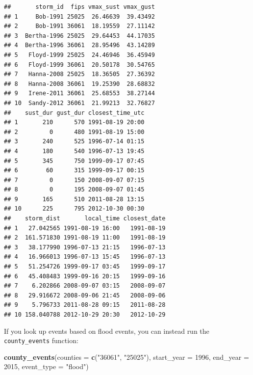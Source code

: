 \documentclass[]{tufte-book}
\newenvironment{Shaded}{}{}
\newcommand{\DataTypeTok}[1]{\textcolor[rgb]{0.56,0.13,0.00}{#1}}
\newcommand{\DecValTok}[1]{\textcolor[rgb]{0.25,0.63,0.44}{#1}}
\newcommand{\KeywordTok}[1]{\textcolor[rgb]{0.00,0.44,0.13}{\textbf{#1}}}
\newcommand{\NormalTok}[1]{#1}
\newcommand{\StringTok}[1]{\textcolor[rgb]{0.25,0.44,0.63}{#1}}
\begin{document}
\begin{verbatim}
##       storm_id  fips vmax_sust vmax_gust
## 1     Bob-1991 25025  26.46639  39.43492
## 2     Bob-1991 36061  18.19559  27.11142
## 3  Bertha-1996 25025  29.64453  44.17035
## 4  Bertha-1996 36061  28.95496  43.14289
## 5   Floyd-1999 25025  24.46946  36.45949
## 6   Floyd-1999 36061  20.50178  30.54765
## 7   Hanna-2008 25025  18.36505  27.36392
## 8   Hanna-2008 36061  19.25390  28.68832
## 9   Irene-2011 36061  25.68553  38.27144
## 10  Sandy-2012 36061  21.99213  32.76827
##    sust_dur gust_dur closest_time_utc
## 1       210      570 1991-08-19 20:00
## 2         0      480 1991-08-19 15:00
## 3       240      525 1996-07-14 01:15
## 4       180      540 1996-07-13 19:45
## 5       345      750 1999-09-17 07:45
## 6        60      315 1999-09-17 00:15
## 7         0      150 2008-09-07 07:15
## 8         0      195 2008-09-07 01:45
## 9       165      510 2011-08-28 13:15
## 10      225      795 2012-10-30 00:30
##    storm_dist       local_time closest_date
## 1   27.042565 1991-08-19 16:00   1991-08-19
## 2  161.571830 1991-08-19 11:00   1991-08-19
## 3   38.177990 1996-07-13 21:15   1996-07-13
## 4   16.966013 1996-07-13 15:45   1996-07-13
## 5   51.254726 1999-09-17 03:45   1999-09-17
## 6   45.408483 1999-09-16 20:15   1999-09-16
## 7    6.202866 2008-09-07 03:15   2008-09-07
## 8   29.916672 2008-09-06 21:45   2008-09-06
## 9    5.796733 2011-08-28 09:15   2011-08-28
## 10 158.040788 2012-10-29 20:30   2012-10-29
\end{verbatim}

If you look up events based on flood events, you can instead run the
\texttt{county\_events} function:

\begin{Shaded}
\begin{Highlighting}[]
\KeywordTok{county_events}\NormalTok{(}\DataTypeTok{counties =} \KeywordTok{c}\NormalTok{(}\StringTok{"36061"}\NormalTok{, }\StringTok{"25025"}\NormalTok{), }
    \DataTypeTok{start_year =} \DecValTok{1996}\NormalTok{, }\DataTypeTok{end_year =} \DecValTok{2015}\NormalTok{, }\DataTypeTok{event_type =} \StringTok{"flood"}\NormalTok{)}
\end{Highlighting}
\end{Shaded}
\end{document}
